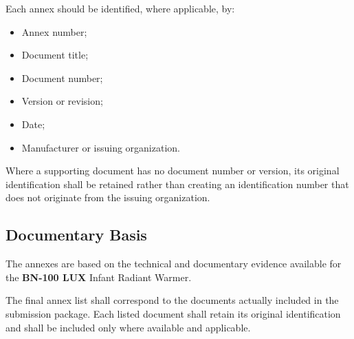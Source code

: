 Each annex should be identified, where applicable, by:

\begin{itemize}

    \item Annex number;

    \item Document title;

    \item Document number;

    \item Version or revision;

    \item Date;

    \item Manufacturer or issuing organization.

\end{itemize}

Where a supporting document has no document number or version, its
original identification shall be retained rather than creating an
identification number that does not originate from the issuing
organization.

\subsection{Documentary Basis}

The annexes are based on the technical and documentary evidence
available for the \textbf{BN-100 LUX} Infant Radiant Warmer.

The final annex list shall correspond to the documents actually
included in the submission package. Each listed document shall retain
its original identification and shall be included only where available
and applicable.
